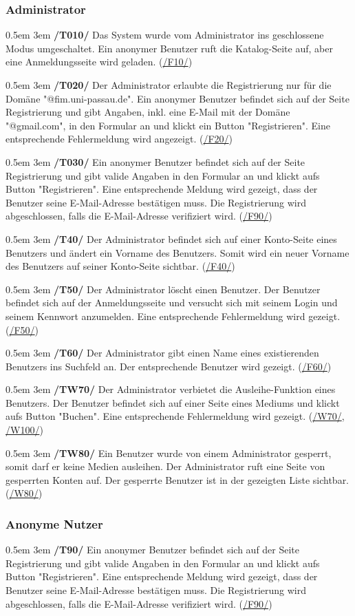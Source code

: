 \documentclass{article}
\newcommand{\specification}[3]{
	{\parindent 0.5em \hangindent 3em \hypertarget{spec:#1:#2}{\textbf{/#1#2/}} #3 \par \nobreak \vspace*{0.5em}}
}
\begin{document}
		\subsubsection{Administrator}
			\specification{T}{010}{Das System wurde vom Administrator ins geschlossene Modus umgeschaltet. Ein anonymer Benutzer ruft die Katalog-Seite auf, aber eine Anmeldungsseite wird geladen.­­­­­ (\hyperlink{spec:F:10}{/F10/}) }
			\specification{T}{020}{Der Administrator erlaubte die Registrierung nur für die Domäne "@fim.uni-passau.de". 
				Ein anonymer Benutzer befindet sich auf der Seite Registrierung und gibt Angaben, inkl. eine E-Mail mit der Domäne "@gmail.com", in den Formular an und klickt ein Button "Registrieren". 
				Eine entsprechende Fehlermeldung wird angezeigt. (\hyperlink{spec:F:20}{/F20/}) }
			\specification{T}{030}{Ein anonymer Benutzer befindet sich auf der Seite Registrierung und gibt valide Angaben in den Formular an und klickt aufs Button "Registrieren". 
				Eine entsprechende Meldung wird gezeigt, dass der Benutzer seine E-Mail-Adresse bestätigen muss. Die Registrierung wird abgeschlossen, falls die E-Mail-Adresse verifiziert wird. (\hyperlink{spec:F:90}{/F90/}) }
			\specification{T}{40}{Der Administrator befindet sich auf einer Konto-Seite eines Benutzers und ändert ein Vorname des Benutzers. Somit wird ein neuer Vorname des Benutzers auf seiner Konto-Seite sichtbar. (\hyperlink{spec:F:40}{/F40/}) }
			\specification{T}{50}{Der Administrator löscht einen Benutzer. Der Benutzer befindet sich auf der Anmeldungsseite und versucht sich mit seinem Login und seinem Kennwort anzumelden. Eine entsprechende Fehlermeldung wird gezeigt.
				(\hyperlink{spec:F:50}{/F50/}) } 
			\specification{T}{60}{Der Administrator gibt einen Name eines existierenden Benutzers ins Suchfeld an. Der entsprechende Benutzer wird gezeigt. (\hyperlink{spec:F:60}{/F60/}) }
			\specification{TW}{70}{Der Administrator verbietet die Ausleihe-Funktion eines Benutzers. Der Benutzer befindet sich auf einer Seite eines Mediums und klickt aufs Button "Buchen". Eine entsprechende Fehlermeldung wird gezeigt. 
				(\hyperlink{spec:W:70}{/W70/}, \hyperlink{spec:W:100}{/W100/}) }
			\specification{TW}{80}{Ein Benutzer wurde von einem Administrator gesperrt, somit darf er keine Medien ausleihen. Der Administrator ruft eine Seite von gesperrten Konten auf. Der gesperrte Benutzer ist in der gezeigten Liste sichtbar. 
				(\hyperlink{spec:W:80}{/W80/}) }
			\subsubsection{Anonyme Nutzer}
			\specification{T}{90}{Ein anonymer Benutzer befindet sich auf der Seite Registrierung und gibt valide Angaben in den Formular an und klickt aufs Button "Registrieren".
				Eine entsprechende Meldung wird gezeigt, dass der Benutzer seine E-Mail-Adresse bestätigen muss. Die Registrierung wird abgeschlossen, falls die E-Mail-Adresse verifiziert wird. (\hyperlink{spec:F:90}{/F90/}) }
\end{document}
